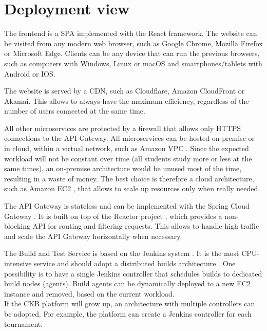 \section{Deployment view}
\begin{adjustbox}{
        max size={\textwidth}{},
        center,
        caption={Deployment view diagram},
        label={fig:Deployment view diagram},
        figure=H}
\end{adjustbox}
The frontend is a SPA implemented with the React framework.
The website can be visited from any modern web browser, such as Google Chrome, Mozilla Firefox or Microsoft Edge.
Clients can be any device that can run the previous browsers, such as computers with Windows, Linux or macOS and smartphones/tablets with Android or IOS.

The website is served by a CDN, such as Cloudflare, Amazon CloudFront or Akamai.
This allows to always have the maximum efficiency, regardless of the number of users connected at the same time.

All other microservices are protected by a firewall that allows only HTTPS connections to the API Gateway.
All microservices can be hosted on-premise or in cloud, within a virtual network, such as Amazon VPC \cite{VPC}.
Since the expected workload will not be constant over time (all students study more or less at the same times),
an on-premise architecture would be unused most of the time, resulting in a waste of money.
The best choice is therefore a cloud architecture, such as Amazon EC2 \cite{EC2}, that allows to scale up resources only when really needed.

The API Gateway is stateless and can be implemented with the Spring Cloud Gateway \cite{SpringCloudGateway}.
It is built on top of the Reactor project \cite{Reactor}, which provides a non-blocking API for routing and filtering requests.
This allows to handle high traffic and scale the API Gateway horizontally when necessary.

The Build and Test Service is based on the Jenkins system \cite{Jenkins}.
It is the most CPU-intensive service and should adopt a distributed builds architecture \cite{JenkinsScale}.
One possibility is to have a single Jenkins controller that schedules builds to dedicated build nodes (agents).
Build agents can be dynamically deployed to a new EC2 instance and removed, based on the current workload.\\
If the CKB platform will grow up, an architecture with multiple controllers can be adopted.
For example, the platform can create a Jenkins controller for each tournament.

